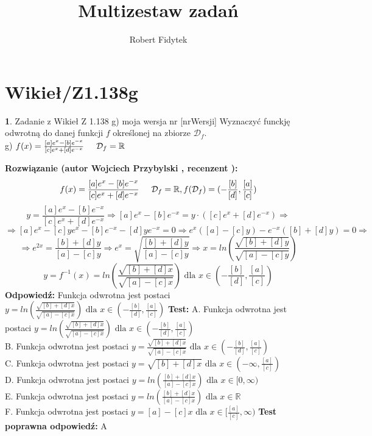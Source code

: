 \documentclass[12pt, a4paper]{article}
\title{Multizestaw zadań}
\author{Robert Fidytek}
\date{}
\theoremstyle{definition} %
\newtheorem{zad}{}
\newcommand{\kategoria}[1]{\section{#1}} %
\newcommand{\zadStart}[1]{\begin{zad}#1\newline} %
\newcommand{\zadStop}{\end{zad}}   %
\newcommand{\rozwStart}[2]{\noindent \textbf{Rozwiązanie (autor #1 , recenzent #2): }\newline} %
\newcommand{\rozwStop}{\newline}                                            %
\newcommand{\odpStart}{\noindent \textbf{Odpowiedź:}\newline}    %
\newcommand{\odpStop}{\newline}                                             %
\newcommand{\testStart}{\noindent \textbf{Test:}\newline} %
\newcommand{\testStop}{\newline} %
\newcommand{\kluczStart}{\noindent \textbf{Test poprawna odpowiedź:}\newline} %
\newcommand{\kluczStop}{\newline} %
\begin{document}
\maketitle


\kategoria{Wikieł/Z1.138g}
\zadStart{Zadanie z Wikieł Z 1.138 g) moja wersja nr [nrWersji]}
Wyznaczyć funckję odwrotną do danej funkcji $f$ określonej na zbiorze $\mathcal{D}_{f}$.\\
g) $f(x)=\frac{[a]e^{x}-[b]e^{-x}}{[c]e^{x}+[d]e^{-x}}\hspace{5mm}\mathcal{D}_{f}=\mathbb{R}$
\zadStop
\rozwStart{Wojciech Przybylski}{}
$$f(x)=\frac{[a]e^{x}-[b]e^{-x}}{[c]e^{x}+[d]e^{-x}}\hspace{5mm} \mathcal{D}_{f}=\mathbb{R}, f(\mathcal{D}_{f})=(-\frac{[b]}{[d]},\frac{[a]}{[c]})$$
$$y=\frac{[a]e^{x}-[b]e^{-x}}{[c]e^{x}+[d]e^{-x}}\Rightarrow [a]e^{x}-[b]e^{-x}=y\cdot([c]e^{x}+[d]e^{-x}) \Rightarrow $$
$$\Rightarrow [a]e^{x}-[c]ye^{x}-[b]e^{-x}-[d]ye^{-x}=0 \Rightarrow e^{x}([a]-[c]y)-e^{-x}([b]+[d]y)=0 \Rightarrow$$
$$\Rightarrow e^{2x}=\frac{[b]+[d]y}{[a]-[c]y} \Rightarrow e^{x}=\sqrt{\frac{[b]+[d]y}{[a]-[c]y}} \Rightarrow x=ln(\frac{\sqrt{[b]+[d]y}}{\sqrt{[a]-[c]y}})$$
$$y=f^{-1}(x)=ln(\frac{\sqrt{[b]+[d]x}}{\sqrt{[a]-[c]x}}) \mbox{ dla } x\in (-\frac{[b]}{[d]},\frac{[a]}{[c]})$$
\rozwStop
\odpStart
Funkcja odwrotna jest postaci $y=ln(\frac{\sqrt{[b]+[d]x}}{\sqrt{[a]-[c]x}})  \mbox{ dla }x\in (-\frac{[b]}{[d]},\frac{[a]}{[c]})$
\odpStop
\testStart
A. Funkcja odwrotna jest postaci $y=ln(\frac{\sqrt{[b]+[d]x}}{\sqrt{[a]-[c]x}})   \mbox{ dla }x\in(-\frac{[b]}{[d]},\frac{[a]}{[c]})$\\
B. Funkcja odwrotna jest postaci $y=\frac{\sqrt{[b]+[d]x}}{\sqrt{[a]-[c]x}}  \mbox{ dla }x\in(-\frac{[b]}{[d]},\frac{[a]}{[c]})$\\
C. Funkcja odwrotna jest postaci $y=\sqrt{[b]+[d]x} \mbox{ dla }x\in(-\infty,\frac{[a]}{[c]})$\\
D. Funkcja odwrotna jest postaci $y=ln(\frac{[b]+[d]x}{[a]-[c]x})  \mbox{ dla }x\in[0,\infty)$\\
E. Funkcja odwrotna jest postaci $y=ln(\frac{[b]+[d]x}{[a]-[c]x})  \mbox{ dla }x\in \mathbb{R}$\\
F. Funkcja odwrotna jest postaci $y=[a]-[c]x\mbox{ dla }x\in[\frac{[a]}{[c]},\infty)$
\testStop
\kluczStart
A
\kluczStop
\end{document}
